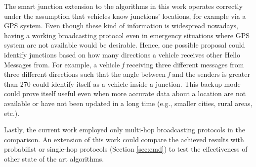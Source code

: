 		
		The smart junction extension to the algorithms in this work operates correctly under the assumption that vehicles know junctions' locations, for example via a GPS system. Even though these kind of information is widespread nowadays, having a working broadcasting protocol even in emergency situations where GPS system are not available would be desirable. Hence, one possible proposal could identify junctions based on how many directions a vehicle receives other Hello Messages from. For example, a vehicle \textit{f} receiving three different messages from three different directions such that the angle between \textit{f} and the senders is greater than {270\textdegree} could identify itself as a vehicle inside a junction. This backup mode could prove itself useful even when more accurate data about a location are not available or have not been updated in a long time (e.g., smaller cities, rural areas, etc.).
		
		
		Lastly, the current work employed only multi-hop broadcasting protocols in the comparison. An extension of this work could compare the achieved results with probabilist or single-hop protocols (Section \ref{sec:emd}) to test the effectiveness of other state of the art algorithms.
		
		
%
%

